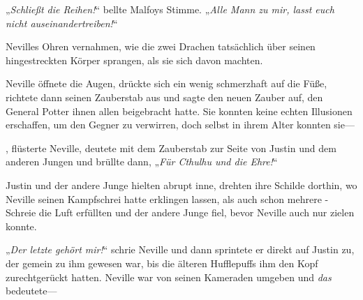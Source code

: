 „\emph{Schließt die Reihen!}“ bellte Malfoys Stimme. „\emph{Alle Mann zu mir, lasst euch nicht auseinandertreiben!}“

Nevilles Ohren vernahmen, wie die zwei Drachen tatsächlich über seinen hingestreckten Körper sprangen, als sie sich davon machten.

Neville öffnete die Augen, drückte sich ein wenig schmerzhaft auf die Füße, richtete dann seinen Zauberstab aus und sagte den neuen Zauber auf, den General Potter ihnen allen beigebracht hatte. Sie konnten keine echten Illusionen erschaffen, um den Gegner zu verwirren, doch selbst in ihrem Alter konnten sie—

,%
flüsterte Neville, deutete mit dem Zauberstab zur Seite von Justin und dem anderen Jungen und brüllte dann, „\emph{Für Cthulhu und die Ehre!}“

Justin und der andere Junge hielten abrupt inne, drehten ihre Schilde dorthin, wo Neville seinen Kampfschrei hatte erklingen lassen, als auch schon mehrere -Schreie die Luft erfüllten und der andere Junge fiel, bevor Neville auch nur zielen konnte.

„\emph{Der letzte gehört mir!}“ schrie Neville und dann sprintete er direkt auf Justin zu, der gemein zu ihm gewesen war, bis die älteren Hufflepuffs ihm den Kopf zurechtgerückt hatten. Neville war von seinen Kameraden umgeben und \emph{das} bedeutete—

